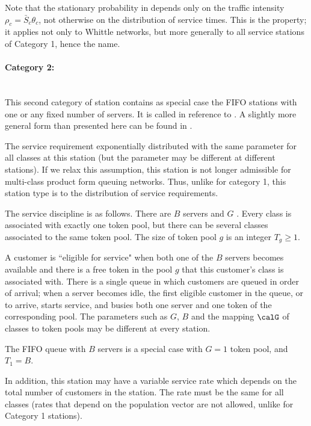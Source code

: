 Note that the stationary probability in
 depends
 only on the traffic intensity $\rho_c=\bar{S}_c
 \theta_c$, not otherwise on the distribution of
 service times. This is the 
 property; it applies not only to Whittle networks, but more
 generally to all service stations of Category 1,
 hence the name.


\paragraph{Category 2:  }~\\

This second category of station contains as
special case the FIFO stations with one or any
fixed number of servers. It is called
 in reference to
\cite{chiola1988product,le1986bcmp,berezner1995quasi}.
A slightly more general form than presented here can be found in
\cite{adan98sum}.

The service requirement 
exponentially distributed with the same parameter
for all classes at this station (but the
parameter may be different at different
stations). If we relax this assumption, this
station is not longer admissible for multi-class
product form queuing networks. Thus, unlike for
category 1, this station type is 
to the distribution of service requirements.

The service discipline is as follows. There are
$B$ servers and $G$ . Every class
is associated with exactly one token pool, but
there can be several classes associated to the
same token pool. The size of token pool $g$ is an
integer $T_g\geq 1$.

A customer is ``eligible for service" when both one of the $B$
servers becomes available and there is a free token in the pool
$g$ that this customer's class is associated with. There is a
single queue in which customers are queued in order of arrival;
when a server becomes idle, the first eligible customer in the
queue, or to arrive, starts service, and busies both one server
and one token of the corresponding pool. The parameters such as
$G$, $B$ and the mapping $\calG$ of classes to token pools may
be different at every station.

The FIFO queue with $B$ servers is a special case
with $G=1$ token pool, and $T_1=B$.

In addition, this station may have a variable
service rate which depends on the total number of
customers in the station. The rate must be the
same for all classes  (rates that depend on the
population vector are not allowed, unlike for
Category 1 stations).

